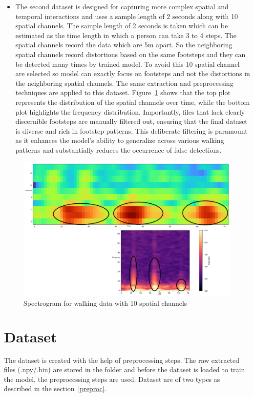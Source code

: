 \begin{itemize}
    \item The second dataset is designed for capturing more complex spatial and temporal interactions and uses a sample length of 2 seconds along with 10 spatial channels. The sample length of 2 seconds is taken which can be estimated as the time length in which a person can take 3 to 4 steps. The spatial channels record the data which are 5m apart. So the neighboring spatial channels record distortions based on the same footsteps and they can be detected many times by trained model. To avoid this 10 spatial channel are selected so model can exactly focus on footsteps and not the distortions in the neighboring spatial channels. The same extraction and preprocessing techniques are applied to this dataset. Figure~\ref{walking_10ch} shows that the top plot represents the distribution of the spatial channels over time, while the bottom plot highlights the frequency distribution. Importantly, files that lack clearly discernible footsteps are manually filtered out, ensuring that the final dataset is diverse and rich in footstep patterns. This deliberate filtering is paramount as it enhances the model's ability to generalize across various walking patterns and substantially reduces the occurrence of false detections.
\end{itemize}

\begin{figure}[h]
    \centering
    \includegraphics[width=0.8\linewidth]{Bilder/jpg/walking_10ch.png}
    \caption{Spectrogram for walking data with 10 spatial channels}
    \label{walking_10ch}
\end{figure}

\section{Dataset}
\label{sec:dataset}
The dataset is created with the help of preprocessing steps. The raw extracted files (.npy/.bin) are stored in the folder and before the dataset is loaded to train the model, the preprocessing steps are used. Dataset are of two types as described in the section~\ref{preproc}.

